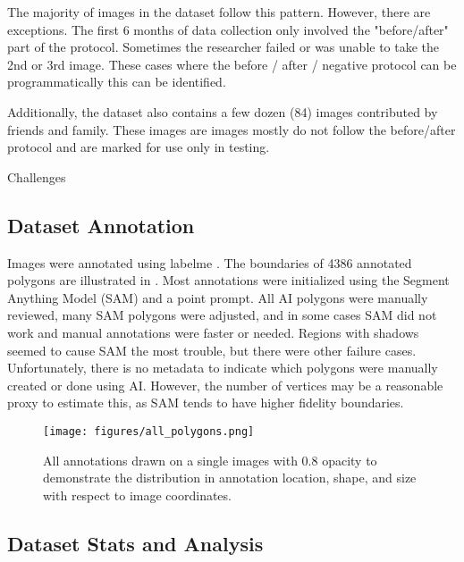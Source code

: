 \documentclass[10pt,twocolumn,letterpaper]{article}
\begin{document}
The majority of images in the dataset follow this pattern.
However, there are exceptions.
The first 6 months of data collection only involved the "before/after" part of the protocol.
Sometimes the researcher failed or was unable to take the 2nd or 3rd image.
These cases where the before / after / negative protocol can be
programmatically this can be identified.

Additionally, the dataset also contains a few dozen (84) images contributed
by friends and family. These images are images mostly do not follow the
before/after protocol and are marked for use only in testing.


Challenges

\subsection{Dataset Annotation}

Images were annotated using labelme \cite{wada_labelmeailabelme_nodate}. 
The boundaries of 4386 annotated polygons are illustrated in .
Most annotations were initialized using the Segment Anything Model (SAM)
\cite{kirillov_segment_2023} and a point prompt. 
All AI polygons were manually reviewed, many SAM polygons were adjusted, and in
some cases SAM did not work and manual annotations were faster or needed.
Regions with shadows seemed to cause SAM the most trouble, but there were other
failure cases. Unfortunately, there is no metadata to indicate which polygons
were manually created or done using AI.  However, the number of vertices may be
a reasonable proxy to estimate this, as SAM tends to have higher fidelity
boundaries. 


\begin{figure}[h]
\centering
\texttt{[image: figures/all\_polygons.png]}
\caption[]{
    All annotations drawn on a single images with 0.8 opacity to demonstrate
    the distribution in annotation location, shape, and size with respect to
    image coordinates.
}
\label{fig:AllPolygons}
\end{figure}

\subsection{Dataset Stats and Analysis}
\end{document}
